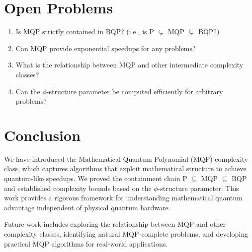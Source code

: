 \documentclass{article}
\theoremstyle{remark}
\begin{document}
\section{Open Problems}

\begin{enumerate}
\item Is MQP strictly contained in BQP? (i.e., is P $\subsetneq$ MQP $\subsetneq$ BQP?)
\item Can MQP provide exponential speedups for any problems?
\item What is the relationship between MQP and other intermediate complexity classes?
\item Can the $\phi$-structure parameter be computed efficiently for arbitrary problems?
\end{enumerate}

\section{Conclusion}

We have introduced the Mathematical Quantum Polynomial (MQP) complexity class, which captures algorithms that exploit mathematical structure to achieve quantum-like speedups. We proved the containment chain P $\subseteq$ MQP $\subseteq$ BQP and established complexity bounds based on the $\phi$-structure parameter. This work provides a rigorous framework for understanding mathematical quantum advantage independent of physical quantum hardware.

Future work includes exploring the relationship between MQP and other complexity classes, identifying natural MQP-complete problems, and developing practical MQP algorithms for real-world applications.
\end{document}
